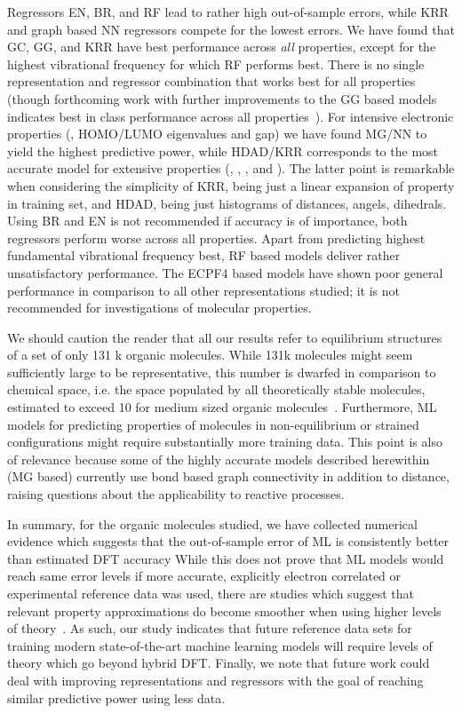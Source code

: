 \documentclass[reprint, superscriptaddress,
amsmath,amssymb, aps, prb,
]{revtex4-1}
\begin{document}
{Regressors EN, BR, and RF lead to rather high out-of-sample errors, while KRR and graph based NN regressors compete for the lowest errors. 
We have found that GC, GG, and KRR have best performance across {\em all} properties, except for the highest vibrational frequency for which RF performs best. 
There is no single representation and regressor combination that works best for all properties
(though forthcoming work with further improvements to the GG based models indicates best 
in class performance across all properties~\cite{NeuralMessagePassing}).
For intensive electronic properties (, HOMO/LUMO eigenvalues and gap) we have found MG/NN to yield the highest predictive power,
while HDAD/KRR corresponds to the most accurate model for extensive properties (, , ,  and ). 
The latter point is remarkable when considering the simplicity of KRR, being just a linear expansion of property in training set, and 
HDAD, being just histograms of distances, angels, dihedrals.
Using BR and EN is not recommended if accuracy is of importance, both regressors perform worse across all properties. 
Apart from predicting highest fundamental vibrational frequency best, RF based models deliver rather unsatisfactory performance.
The ECPF4 based models have shown poor general performance in comparison to all other representations studied; 
it is not recommended for investigations of molecular properties.

We should caution the reader that all our results refer to equilibrium structures of a set of only 131 k organic molecules. 
While 131k molecules might seem sufficiently large to be representative, this number is dwarfed in comparison to chemical space, i.e. the space populated by all theoretically stable molecules, 
estimated to exceed 10 for medium sized organic molecules~\cite{ChemicalSpace}. 
Furthermore, ML models for predicting properties of molecules in non-equilibrium or strained  configurations might require substantially more training data. 
This point is also of relevance because some of the highly accurate models described herewithin (MG based) 
currently use bond based graph connectivity in addition to distance, raising questions about the applicability to reactive processes.

In summary, for the organic molecules studied, we have collected numerical evidence which suggests that the out-of-sample error of ML 
is consistently better than estimated DFT accuracy 
While this does not prove that ML models would reach same error levels if more accurate, explicitly electron correlated or experimental reference data was used, 
there are studies which suggest that relevant property  approximations do become smoother when using higher levels of theory~\cite{Goedecker2010,delta_learning}.
As such, our study indicates that future reference data sets for training modern state-of-the-art machine learning models will require levels of theory which go beyond hybrid DFT. 
Finally, we note that future work could deal with improving representations and regressors with the goal of reaching similar predictive power using less data. 


}
\end{document}
